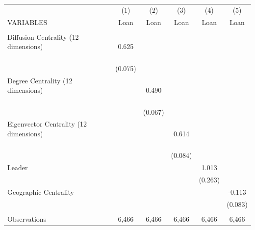 \begin{tabular}{lccccc} \hline
 & (1) & (2) & (3) & (4) & (5) \\
VARIABLES & Loan & Loan & Loan & Loan & Loan \\ \hline
 &  &  &  &  &  \\
Diffusion Centrality (12 dimensions) \ \ \ \ \ \ \ \ \ \ \ \ \ \ \ \ \ \ \ \ \ \ & 0.625 &  &  &  &  \\
 & (0.075) &  &  &  &  \\
Degree Centrality (12 dimensions) \ \ \ \ \ \ \ \ \ \ \ \ \ \ \ \ \ \ \ \ \ \ \ &  & 0.490 &  &  &  \\
 &  & (0.067) &  &  &  \\
Eigenvector Centrality (12 dimensions) \ \ \ \ \ \ \ \ \ \ \ \ \ \ \ \ \ \ \ \ \ &  &  & 0.614 &  &  \\
 &  &  & (0.084) &  &  \\
Leader &  &  &  & 1.013 &  \\
 &  &  &  & (0.263) &  \\
Geographic Centrality &  &  &  &  & -0.113 \\
 &  &  &  &  & (0.083) \\
 &  &  &  &  &  \\
 Observations & 6,466 & 6,466 & 6,466 & 6,466 & 6,466 \\ \hline
\end{tabular}
